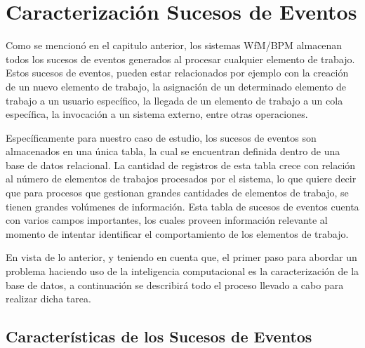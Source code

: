 
\chapter{Caracterización Sucesos de Eventos}

\ifpdf
    \graphicspath{{Chapter2/Figs/Raster/}{Chapter2/Figs/PDF/}{Chapter2/Figs/}}
\else
    \graphicspath{{Chapter2/Figs/Vector/}{Chapter2/Figs/}}
\fi

Como se mencionó en el capitulo anterior, los sistemas WfM/BPM almacenan todos los sucesos de eventos generados al procesar cualquier elemento de trabajo. Estos sucesos de eventos, pueden estar relacionados por ejemplo con la creación de un nuevo elemento de trabajo, la asignación de un determinado elemento de trabajo a un usuario específico, la llegada de un elemento de trabajo a un cola específica, la invocación a un sistema externo, entre otras operaciones.

Específicamente para nuestro caso de estudio, los sucesos de eventos son almacenados en una única tabla, la cual se encuentran definida dentro de una base de datos relacional. La cantidad de registros de esta tabla crece con relación al número de elementos de trabajos procesados por el sistema, lo que quiere decir que para procesos que gestionan grandes cantidades de elementos de trabajo, se tienen grandes volúmenes de información. Esta tabla de sucesos de eventos cuenta con varios campos importantes, los cuales proveen información relevante al momento de intentar identificar el comportamiento de los elementos de trabajo.

En vista de lo anterior, y teniendo en cuenta que, el primer paso para abordar un problema haciendo uso de la inteligencia computacional es la caracterización de la base de datos, a continuación se describirá todo el proceso llevado a cabo para realizar dicha tarea.

\section{Características de los Sucesos de Eventos} %
\label{section2.1}

